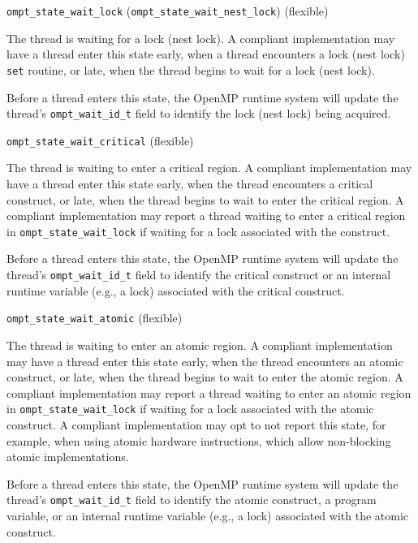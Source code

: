 \documentclass{article}
\newcommand{\descheader}[1]{{\needspace{3\baselineskip}\vspace{1em}\noindent \fbox{#1}}}
\begin{document}
\descheader{Mutex Wait States}

\begin{description}

\item \verb|ompt_state_wait_lock| (\verb|ompt_state_wait_nest_lock|) (flexible)

  The thread is waiting for a  lock (nest lock). A compliant implementation
  may have a thread enter this state early, when a thread
  encounters a lock (nest lock) \verb|set| routine, or late, when the thread
  begins to wait for a lock (nest lock).

  Before a thread enters this state, the OpenMP runtime system will
  update the thread's \verb|ompt_wait_id_t| field to identify the lock (nest lock) being acquired.

\item \verb|ompt_state_wait_critical| (flexible)

  The thread is waiting to enter a critical region. A compliant
  implementation may have a thread enter this state early, when the
  thread encounters a critical construct, or late, when the thread
  begins to wait to enter the critical region. A compliant
  implementation may report a thread waiting to enter a critical
  region in \verb|ompt_state_wait_lock| if waiting for a lock associated with the construct.

  Before a thread enters this state, the OpenMP runtime system will
  update the thread's \verb|ompt_wait_id_t| field to identify the critical construct or an internal runtime variable (e.g., a lock) associated with the critical construct.

\item \verb|ompt_state_wait_atomic| (flexible)

  The thread is waiting to enter an atomic region. A compliant
  implementation may have a thread enter this state early, when the thread
  encounters an atomic construct, or late, when the thread begins
  to wait to enter the atomic region. A compliant
  implementation may report a thread waiting to enter an atomic
  region in \verb|ompt_state_wait_lock| if waiting for a lock associated with the atomic construct.
  A compliant implementation may opt to not report
  this state, for example, when using atomic hardware instructions, which allow non-blocking atomic implementations.

  Before a thread enters this state, the OpenMP runtime system will
  update the thread's \verb|ompt_wait_id_t| field to identify the atomic construct, a program variable, or an internal runtime variable (e.g., a lock) associated with the atomic construct.



\end{description}
\end{document}
